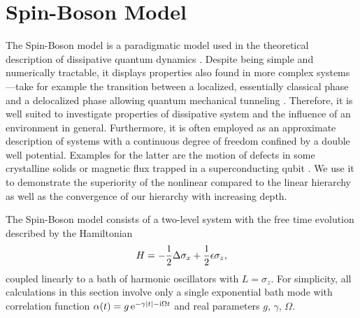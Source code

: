 

\section{Spin-Boson Model}
\label{sec:num.spin_boson}
%


The Spin-Boson model is a paradigmatic model used in the theoretical description of dissipative quantum dynamics \cite{Le87_spinboson,We99_dissipative_systems}.
Despite being simple and numerically tractable, it displays properties also found in more complex systems---take for example the transition between a localized, essentially classical phase and a delocalized phase allowing quantum mechanical tunneling \cite{FlVeNa10_spin_boson}.
Therefore, it is well suited to investigate properties of dissipative system and the influence of an environment in general.
Furthermore, it is often employed as an approximate description of systems with a continuous degree of freedom confined by a double well potential.
Examples for the latter are the motion of defects in some crystalline solids or magnetic flux trapped in a superconducting qubit \cite{CaLe83_diss_system}.
We use it to demonstrate the superiority of the nonlinear compared to the linear hierarchy as well as the convergence of our hierarchy with increasing depth.

The Spin-Boson model consists of a two-level system with the free time evolution described by the Hamiltonian
\begin{equation*}
  H = - \frac{1}{2}\Delta \sigma_x + \frac{1}{2} \epsilon \sigma_z,
\end{equation*}
coupled linearly to a bath of harmonic oscillators with $L=\sigma_z$.
For simplicity, all calculations in this section involve only a single exponential bath mode with correlation function $\alpha(t) = g \,\exp[-\gamma \abs{t} - \ii\Omega t]$ and real parameters $g$, $\gamma$, $\Omega$.


